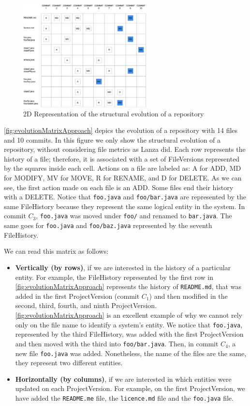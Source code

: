 \begin{figure}
    \center
    \includegraphics[width=0.6\textwidth]{2DMatrix.jpg}
    \caption{2D Representation of the structural evolution of a repository}
    \label{fig:evolutionMatrixApproach}
\end{figure}
\autoref{fig:evolutionMatrixApproach} depics the evolution of a repository with 14 files and 10 commits. In this figure we only show the structural evolution of a repository, without considering file metrics as Lanza did. 
Each row represents the history of a file; therefore, it is associated with a set of FileVersions represented by the squares inside each cell. Actions on a file are labeled as: A for ADD, MD for MODIFY, MV for MOVE, R for RENAME, and D for DELETE.
As we can see, the first action made on each file is an ADD. Some files end their history with a DELETE. Notice that \texttt{foo.java} and \texttt{foo/bar.java} are represented by the same FileHistory because they represent the same logical entity in the system. 
In commit $C_3$, \texttt{foo.java} was moved under \texttt{foo/} and renamed to  \texttt{bar.java}.
The same goes for \texttt{foo.java} and \texttt{foo/baz.java} represented by the seventh FileHistory.

We can read this matrix as follows:
 \begin{itemize}
     \item \textbf{Vertically (by rows)}, if we are interested in the history of a particular entity. 
     For example, the FileHistory represented by the first row in \autoref{fig:evolutionMatrixApproach} represents the history of \texttt{README.md}, that was added in the first ProjectVersion (commit $C_1$) and then modified in the second, third, fourth, and ninth ProjectVersion.
     \autoref{fig:evolutionMatrixApproach} is an excellent example of why we cannot rely only on the file name to identify a system's entity. 
     We notice that \texttt{foo.java}, represented by the third FileHistory, was added with the first ProjectVersion and then moved with the third into \texttt{foo/bar.java}. 
     Then, in commit $C_4$, a new file \texttt{foo.java} was added. Nonetheless, the name of the files are the same, they represent two different entities. 
     \item \textbf{Horizontally (by columns)}, if we are interested in which entities were updated on each ProjectVersion. 
    For example, on the first ProjectVersion, we have added the \texttt{README.me} file, the \texttt{licence.md} file and the \texttt{foo.java} file. 
 \end{itemize}

